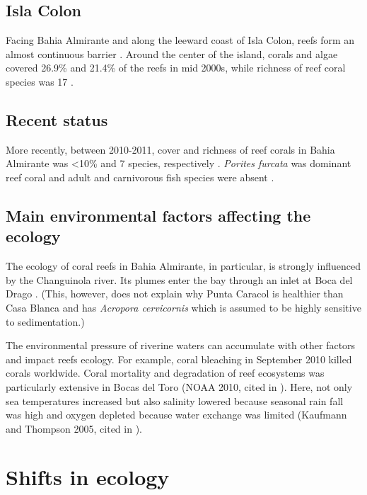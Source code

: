 \documentclass[]{book}
\begin{document}
\subsection{Isla Colon}\label{isla-colon}

Facing Bahia Almirante and along the leeward coast of Isla Colon, reefs
form an almost continuous barrier \citep{Guzman_etal_1998_a}. Around the
center of the island, corals and algae covered 26.9\% and 21.4\% of the
reefs in mid 2000s, while richness of reef coral species was 17
\citep{Guzman_etal_2005}.

\subsection{Recent status}\label{recent-status}

More recently, between 2010-2011, cover and richness of reef corals in
Bahia Almirante was \textless{}10\% and 7 species, respectively
\citep{Seemann_etal_2014}. \emph{Porites furcata} was dominant reef
coral and adult and carnivorous fish species were absent
\citep{Seemann_etal_2014}.

\subsection{Main environmental factors affecting the
ecology}\label{main-environmental-factors-affecting-the-ecology}

The ecology of coral reefs in Bahia Almirante, in particular, is
strongly influenced by the Changuinola river. Its plumes enter the bay
through an inlet at Boca del Drago \citep{Seemann_etal_2014}. (This,
however, does not explain why Punta Caracol is healthier than Casa
Blanca and has \emph{Acropora cervicornis} which is assumed to be highly
sensitive to sedimentation.)

The environmental pressure of riverine waters can accumulate with other
factors and impact reefs ecology. For example, coral bleaching in
September 2010 killed corals worldwide. Coral mortality and degradation
of reef ecosystems was particularly extensive in Bocas del Toro (NOAA
2010, cited in \citet{Seemann_etal_2014}). Here, not only sea
temperatures increased but also salinity lowered because seasonal rain
fall was high and oxygen depleted because water exchange was limited
(Kaufmann and Thompson 2005, cited in \citet{Seemann_etal_2014}).

\section{Shifts in ecology}\label{shifts-in-ecology}
\end{document}
